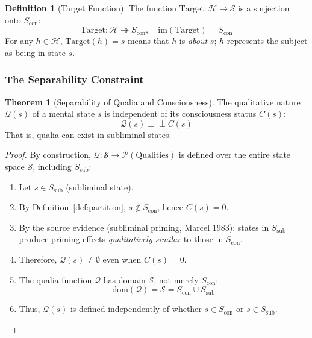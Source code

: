 \documentclass[11pt,a4paper]{article}
\theoremstyle{definition}
\newtheorem{definition}{Definition}[section]
\newtheorem{theorem}{Theorem}[section]
\theoremstyle{remark}
\newcommand{\Sset}{\mathcal{S}}
\newcommand{\Q}{\mathcal{Q}}
\newcommand{\Hset}{\mathcal{H}}
\newcommand{\Scon}{S_{\text{con}}}
\newcommand{\Ssub}{S_{\text{sub}}}
\newcommand{\Target}{\text{Target}}
\begin{document}
\begin{definition}[Target Function]
\label{def:target}
The function $\Target: \Hset \to \Sset$ is a surjection onto $\Scon$:
\begin{equation}
\Target: \Hset \twoheadrightarrow \Scon, \quad \text{im}(\Target) = \Scon
\end{equation}
For any $h \in \Hset$, $\Target(h) = s$ means that $h$ is \textit{about} $s$; $h$ represents the subject as being in state $s$.
\end{definition}

\subsubsection{The Separability Constraint}

\begin{theorem}[Separability of Qualia and Consciousness]
\label{thm:separability}
The qualitative nature $\Q(s)$ of a mental state $s$ is independent of its consciousness status $C(s)$:
\begin{equation}
\boxed{\Q(s) \perp\!\!\!\perp C(s)}
\end{equation}
That is, qualia can exist in subliminal states.
\end{theorem}

\begin{proof}
By construction, $\Q: \Sset \to \mathcal{P}(\text{Qualities})$ is defined over the entire state space $\Sset$, including $\Ssub$:
\begin{enumerate}
    \item Let $s \in \Ssub$ (subliminal state).
    \item By Definition~\ref{def:partition}, $s \notin \Scon$, hence $C(s) = 0$.
    \item By the source evidence (subliminal priming, Marcel 1983): states in $\Ssub$ produce priming effects \textit{qualitatively similar} to those in $\Scon$.
    \item Therefore, $\Q(s) \neq \emptyset$ even when $C(s) = 0$.
    \item The qualia function $\Q$ has domain $\Sset$, not merely $\Scon$:
    \begin{equation}
    \text{dom}(\Q) = \Sset = \Scon \cup \Ssub
    \end{equation}
    \item Thus, $\Q(s)$ is defined independently of whether $s \in \Scon$ or $s \in \Ssub$. \qedhere
\end{enumerate}
\end{proof}
\end{document}
